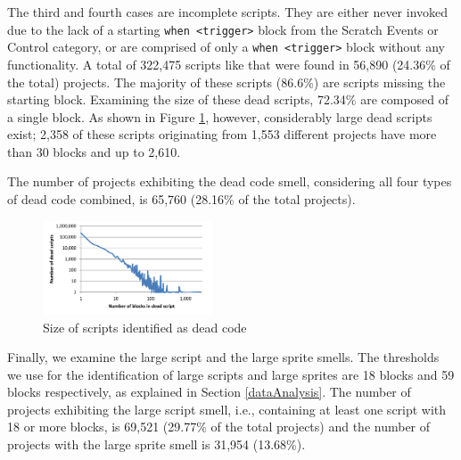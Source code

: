 \documentclass{sig-alternate}
\begin{document}
The third and fourth cases are incomplete scripts. They are either never invoked due to the lack of a starting \texttt{when <trigger>} block from the Scratch Events or Control category, or are comprised of only a \texttt{when <trigger>} block without any functionality. A total of 322,475 scripts like that were found in 56,890 (24.36\% of the total) projects. The majority of these scripts (86.6\%) are scripts missing the starting block. Examining the size of these dead scripts, 72.34\% are composed of a single block. As shown in Figure \ref{fig:deadcode}, however, considerably large dead scripts exist; 2,358 of these scripts originating from 1,553 different projects have more than 30 blocks and up to 2,610.\footnotemark[\ref{repo}]

The number of projects exhibiting the dead code smell, considering all four types of dead code combined, is 65,760 (28.16\% of the total projects).

\begin{figure}
	\centering
	\includegraphics[width=0.45\textwidth]{fig/charts/12deadcode}
	\vspace{-1em}
	\caption{Size of scripts identified as dead code}
	\label{fig:deadcode}
\end{figure}

Finally, we examine the large script and the large sprite smells. The thresholds we use for the identification of large scripts and large sprites are 18 blocks and 59 blocks respectively, as explained in Section \ref{dataAnalysis}. The number of projects exhibiting the large script smell, i.e., containing at least one script with 18 or more blocks, is 69,521 (29.77\% of the total projects) and the number of projects with the large sprite smell is 31,954 (13.68\%).

\noindent
{}
\end{document}
